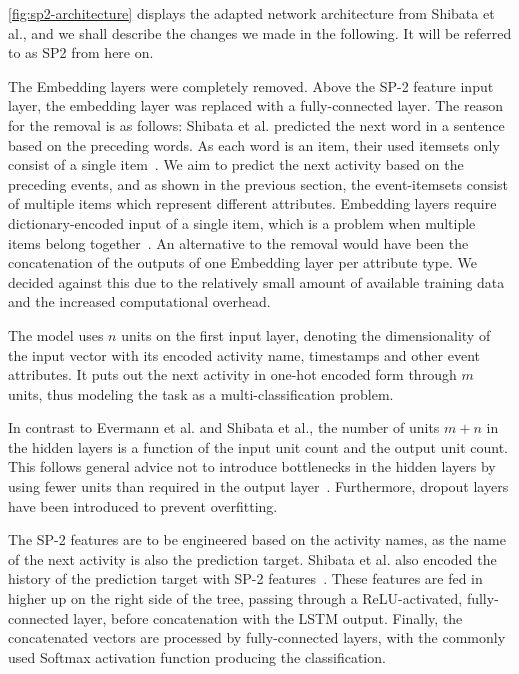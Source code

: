 \autoref{fig:sp2-architecture} displays the adapted network architecture from Shibata et al., and we shall describe the changes we made in the following. It will be referred to as SP2 from here on.

The Embedding layers were completely removed. Above the SP-2 feature input layer, the embedding layer was replaced with a fully-connected layer. The reason for the removal is as follows: Shibata et al. predicted the next word in a sentence based on the preceding words. As each word is an item, their used itemsets only consist of a single item~\cite{shibata2016bipartite}. We aim to predict the next activity based on the preceding events, and as shown in the previous section, the event-itemsets consist of multiple items which represent different attributes.
Embedding layers require dictionary-encoded input of a single item, which is a problem when multiple items belong together~\cite{goldberg2014word2vec}. An alternative to the removal would have been the concatenation of the outputs of one Embedding layer per attribute type. We decided against this due to the relatively small amount of available training data and the increased computational overhead.

The model uses $n$ units on the first input layer, denoting the dimensionality of the input vector with its encoded activity name, timestamps and other event attributes. It puts out the next activity in one-hot encoded form through $m$ units, thus modeling the task as a multi-classification problem.

In contrast to Evermann et al. and Shibata et al., the number of units $m+n$ in the hidden layers is a function of the input unit count and the output unit count. This follows general advice not to introduce bottlenecks in the hidden layers by using fewer units than required in the output layer~\cite{web:techniques-in-convnets,szegedy2016rethinking}. Furthermore, dropout layers have been introduced to prevent overfitting.

The SP-2 features are to be engineered based on the activity names, as the name of the next activity is also the prediction target. Shibata et al. also encoded the history of the prediction target with SP-2 features~\cite{shibata2016bipartite}. These features are fed in higher up on the right side of the tree, passing through a ReLU-activated, fully-connected layer, before concatenation with the LSTM output. Finally, the concatenated vectors are processed by fully-connected layers, with the commonly used Softmax activation function producing the classification.

